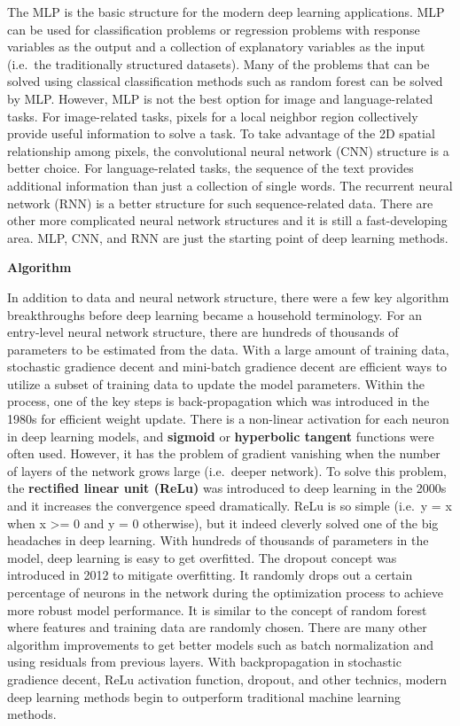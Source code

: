 \documentclass[12pt,]{krantz}
\begin{document}
The MLP is the basic structure for the modern deep learning applications. MLP can be used for classification problems or regression problems with response variables as the output and a collection of explanatory variables as the input (i.e.~the traditionally structured datasets). Many of the problems that can be solved using classical classification methods such as random forest can be solved by MLP. However, MLP is not the best option for image and language-related tasks. For image-related tasks, pixels for a local neighbor region collectively provide useful information to solve a task. To take advantage of the 2D spatial relationship among pixels, the convolutional neural network (CNN) structure is a better choice. For language-related tasks, the sequence of the text provides additional information than just a collection of single words. The recurrent neural network (RNN) is a better structure for such sequence-related data. There are other more complicated neural network structures and it is still a fast-developing area. MLP, CNN, and RNN are just the starting point of deep learning methods.

\textbf{Algorithm}

In addition to data and neural network structure, there were a few key algorithm breakthroughs before deep learning became a household terminology. For an entry-level neural network structure, there are hundreds of thousands of parameters to be estimated from the data. With a large amount of training data, stochastic gradience decent and mini-batch gradience decent are efficient ways to utilize a subset of training data to update the model parameters. Within the process, one of the key steps is back-propagation which was introduced in the 1980s for efficient weight update. There is a non-linear activation for each neuron in deep learning models, and \textbf{sigmoid} or \textbf{hyperbolic tangent} functions were often used. However, it has the problem of gradient vanishing when the number of layers of the network grows large (i.e.~deeper network). To solve this problem, the \textbf{rectified linear unit (ReLu)} was introduced to deep learning in the 2000s and it increases the convergence speed dramatically. ReLu is so simple (i.e.~y = x when x \textgreater{}= 0 and y = 0 otherwise), but it indeed cleverly solved one of the big headaches in deep learning. With hundreds of thousands of parameters in the model, deep learning is easy to get overfitted. The dropout concept was introduced in 2012 to mitigate overfitting. It randomly drops out a certain percentage of neurons in the network during the optimization process to achieve more robust model performance. It is similar to the concept of random forest where features and training data are randomly chosen. There are many other algorithm improvements to get better models such as batch normalization and using residuals from previous layers. With backpropagation in stochastic gradience decent, ReLu activation function, dropout, and other technics, modern deep learning methods begin to outperform traditional machine learning methods.
\end{document}
